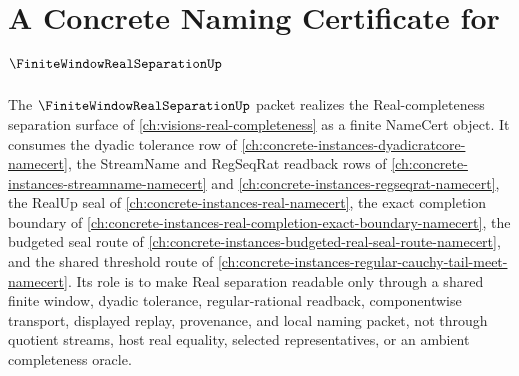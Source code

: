 \chapter{A Concrete Naming Certificate for $\FiniteWindowRealSeparationUp$}
\label{ch:concrete-instances-finite-window-real-separation-namecert}

The $\FiniteWindowRealSeparationUp$ packet realizes the Real-completeness separation surface of \autoref{ch:visions-real-completeness} as a finite NameCert object. It consumes the dyadic tolerance row of \autoref{ch:concrete-instances-dyadicratcore-namecert}, the StreamName and RegSeqRat readback rows of \autoref{ch:concrete-instances-streamname-namecert} and \autoref{ch:concrete-instances-regseqrat-namecert}, the RealUp seal of \autoref{ch:concrete-instances-real-namecert}, the exact completion boundary of \autoref{ch:concrete-instances-real-completion-exact-boundary-namecert}, the budgeted seal route of \autoref{ch:concrete-instances-budgeted-real-seal-route-namecert}, and the shared threshold route of \autoref{ch:concrete-instances-regular-cauchy-tail-meet-namecert}. Its role is to make Real separation readable only through a shared finite window, dyadic tolerance, regular-rational readback, componentwise transport, displayed replay, provenance, and local naming packet, not through quotient streams, host real equality, selected representatives, or an ambient completeness oracle.



